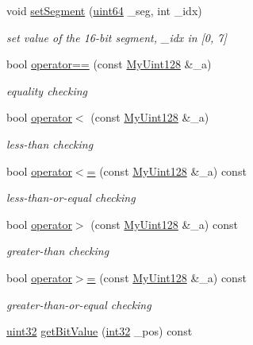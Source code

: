\begin{DoxyCompactItemize}
void \hyperlink{structMyUint128_acf0ae57e1f3d08b55bc0278fa800b07a}{set\-Segment} (\hyperlink{types_8h_aeefdb2888fa3c58f2454ef004419e6a5}{uint64} \-\_\-seg, int \-\_\-idx)
\begin{DoxyCompactList}\small\item\em set value of the 16-\/bit segment, \-\_\-idx in \mbox{[}0, 7\mbox{]} \end{DoxyCompactList}\item 
bool \hyperlink{structMyUint128_a00aca0be0b5fe2b311b791bafbc748dd}{operator==} (const \hyperlink{structMyUint128}{My\-Uint128} \&\-\_\-a)
\begin{DoxyCompactList}\small\item\em equality checking \end{DoxyCompactList}\item 
bool \hyperlink{structMyUint128_aa963ff56fabd117773a54f07a99f1396}{operator$<$} (const \hyperlink{structMyUint128}{My\-Uint128} \&\-\_\-a)
\begin{DoxyCompactList}\small\item\em less-\/than checking \end{DoxyCompactList}\item 
bool \hyperlink{structMyUint128_ae3a3ede959f0648149e7b99754fd46bf}{operator$<$=} (const \hyperlink{structMyUint128}{My\-Uint128} \&\-\_\-a) const 
\begin{DoxyCompactList}\small\item\em less-\/than-\/or-\/equal checking \end{DoxyCompactList}\item 
bool \hyperlink{structMyUint128_ab209271675feca5a4b9d0d458f623485}{operator$>$} (const \hyperlink{structMyUint128}{My\-Uint128} \&\-\_\-a) const 
\begin{DoxyCompactList}\small\item\em greater-\/than checking \end{DoxyCompactList}\item 
bool \hyperlink{structMyUint128_a9a655edff854aaf64201b4b4ad22dfab}{operator$>$=} (const \hyperlink{structMyUint128}{My\-Uint128} \&\-\_\-a) const 
\begin{DoxyCompactList}\small\item\em greater-\/than-\/or-\/equal checking \end{DoxyCompactList}\item 
\hyperlink{types_8h_abd01e8e67e3d94cab04ecaaf4f85ac1b}{uint32} \hyperlink{structMyUint128_ad048bf560df04ef5528d47e3658e71ed}{get\-Bit\-Value} (\hyperlink{types_8h_aae6ad039f09c0676db11bd114136a3fa}{int32} \-\_\-pos) const 

\end{DoxyCompactItemize}
